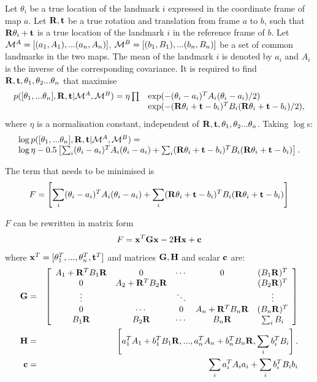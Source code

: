 Let $\theta_i$ be a true location of the landmark $i$ expressed in the
coordinate frame of map $a$. Let ${\bf R,t}$ be a true rotation and
translation from frame $a$ to $b$, such that ${\bf R}\theta_i + {\bf t}$
is a true location of the landmark $i$ in the reference frame of
$b$. Let $\mapA=[(a_1,A_1),...(a_n,A_n)]$,
$\mapB=[(b_1,B_1),...(b_n,B_n)]$ be a set of common landmarks in the two
maps. The mean of the landmark $i$ is denoted by $a_i$ and $A_i$ is the
inverse of the corresponding covariance. It is required to find ${\bf
R,t},\theta_1, \theta_2 ...\theta_n$ that maximise
\begin{equation}
\begin{array}{ll}
p([\theta_1, ...\theta_n],{\bf R},{\bf t} | \mapA, \mapB) =
 \eta \prod& \exp(-(\theta_i - a_i)^T A_i (\theta_i - a_i)/2)\\
&\exp(-({\bf R}\theta_i + {\bf t} - b_i)^T B_i
({\bf R}\theta_i + {\bf t} - b_i)/2),
\label{eqn:align_w0}
\end{array}
\end{equation}
where $\eta$ is a normalisation constant, independent of ${\bf
R,t},\theta_1, \theta_2 ...\theta_n$. Taking $\log$s: 
\begin{equation}
\begin{array}{l}
\log p([\theta_1, ...\theta_n],{\bf R},{\bf t} | \mapA, \mapB) =\\
\log\eta - 0.5 \left[
\sum_i (\theta_i - a_i)^T A_i (\theta_i - a_i) +
\sum_i ({\bf R}\theta_i + {\bf t} - b_i)^T B_i({\bf R}\theta_i + {\bf t} - b_i)
\right].
\end{array}
\label{eqn:align_log_prob}
\end{equation}

The term that needs to be minimised is
$$
F = \left[ \sum_i (\theta_i - a_i)^T A_i (\theta_i - a_i) +
\sum_i ({\bf R}\theta_i + {\bf t} - b_i)^T B_i ({\bf R}\theta_i + {\bf t} - b_i)
\right]
$$

$F$ can be rewritten in matrix form
$$
F =  {\bf x}^T{\bf Gx} -2{\bf Hx} + {\bf c}
$$
where ${\bf x}^T = [\theta_1^T,...,\theta_n^T, {\bf t}^T]$ and
matrices ${\bf G},{\bf H}$ and scalar ${\bf c}$ are:
\begin{eqnarray}
{\bf G} &=& \left[ \begin{array}{ccccc}
A_1 + {\bf R}^TB_1{\bf R}&
0&\cdots&0&
(B_1{\bf R})^T\\
0&A_2 + {\bf R}^TB_2{\bf R}&&&(B_2{\bf R})^T\\
\vdots & & \ddots & & \vdots\\
0&\cdots&0&
A_n + {\bf R}^TB_n{\bf R}&
(B_n{\bf R})^T\\
B_1{\bf R}&B_2{\bf R}&\cdots&
B_n{\bf R}&
\sum_i B_i
\end{array} \right]\\
{\bf H}  &=& \left[a_1^TA_1+b_1^TB_1{\bf  R},...,
a_n^TA_n+b_n^TB_n{\bf R},
\sum_i b_i^TB_i
 \right].\\
{\bf c} &=& \sum_i a_i^TA_ia_i + \sum_i b_i^TB_ib_i
\end{eqnarray}

